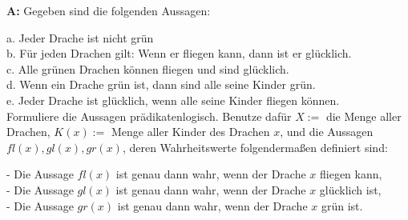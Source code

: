 \documentclass[landscape,twocolumn,a4paper]{article}
\begin{document}
\newpage
\textbf{A:}
Gegeben sind die folgenden Aussagen:

a. Jeder Drache ist nicht grün \\
b. Für jeden Drachen gilt: Wenn er fliegen kann, dann ist er glücklich. \\
c. Alle grünen Drachen können fliegen und sind glücklich. \\
d. Wenn ein Drache grün ist, dann sind alle seine Kinder grün. \\
e. Jeder Drache ist glücklich, wenn alle seine Kinder fliegen können. \\

Formuliere die Aussagen prädikatenlogisch. Benutze dafür $X:=$ die Menge aller Drachen, $K(x):=$ Menge aller 
Kinder des Drachen $x$, und die Aussagen $fl(x), gl(x), gr(x)$, deren Wahrheitswerte folgendermaßen definiert sind:

- Die Aussage $fl(x)$ ist genau dann wahr, wenn der Drache $x$ fliegen kann, \\
- Die Aussage $gl(x)$ ist genau dann wahr, wenn der Drache $x$ glücklich ist, \\
- Die Aussage $gr(x)$ ist genau dann wahr, wenn der Drache $x$ grün ist.
\bigskip {}
\end{document}
